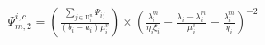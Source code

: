 \documentclass[10pt,journal, compsoc]{IEEEtran}
\begin{document}
\begin{equation}
    \begin{aligned}
        \Psi_{m,2}^{i, c} = (\frac{\sum_{j \in \mathrm{U}_i^n}\Psi_{ij}}{(b_i-a_i)\mu_i^v}) \times (\frac{\lambda_i^m}{\eta_i\xi_i} - \frac{\lambda_i - \lambda_i^m}{\mu_i^v} - \frac{\lambda_i^m}{\eta_i})^{-2}
    \end{aligned}
\end{equation}




\end{document}
